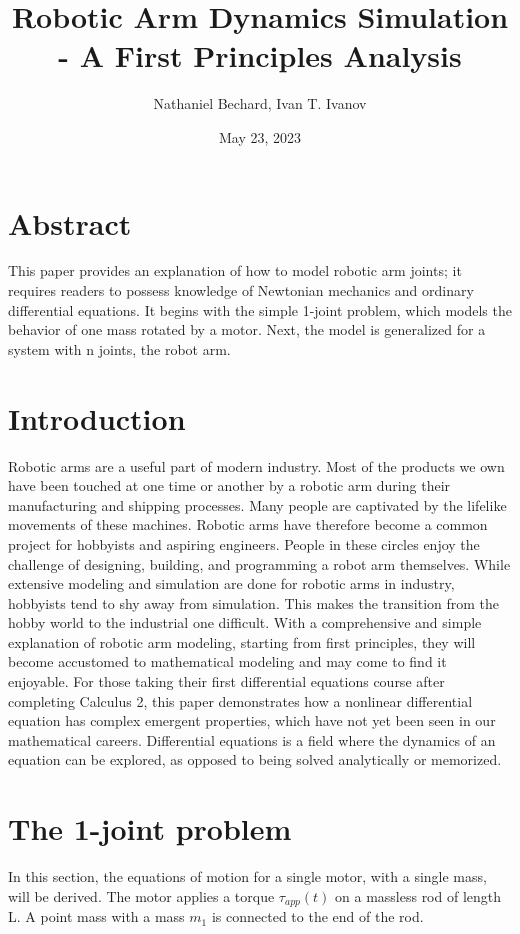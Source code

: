 \documentclass{article}
\title{Robotic Arm Dynamics Simulation - A First Principles Analysis}
\author{Nathaniel Bechard, Ivan T. Ivanov}
\date{May 23, 2023}
\begin{document}
\maketitle
\tableofcontents %

\section{Abstract}
This paper provides an explanation of how to model robotic arm joints; it requires readers to possess knowledge of Newtonian mechanics and ordinary differential equations. It begins with the simple 1-joint problem, which models the behavior of one mass rotated by a motor. Next, the model is generalized for a system with n joints, the robot arm.

%

\section{Introduction}
Robotic arms are a useful part of modern industry. Most of the products we own have been touched at one time or another by a robotic arm during their manufacturing and shipping processes. Many people are captivated by the lifelike movements of these machines. Robotic arms have therefore become a common project for hobbyists and aspiring engineers. People in these circles enjoy the challenge of designing, building, and programming a robot arm themselves. While extensive modeling and simulation are done for robotic arms in industry, hobbyists tend to shy away from simulation. This makes the transition from the hobby world to the industrial one difficult. With a comprehensive and simple explanation of robotic arm modeling, starting from first principles, they will become accustomed to mathematical modeling and may come to find it enjoyable. For those taking their first differential equations course after completing Calculus 2, this paper demonstrates how a nonlinear differential equation has complex emergent properties, which have not yet been seen in our mathematical careers. Differential equations is a field where the dynamics of an equation can be explored, as opposed to being solved analytically or memorized.

\section{The 1-joint problem}
In this section, the equations of motion for a single motor, with a single mass, will be derived. The motor applies a torque $\tau_{app}(t)$ on a massless rod of length L. A point mass with a mass $m_1$ is connected to the end of the rod. 
\end{document}
